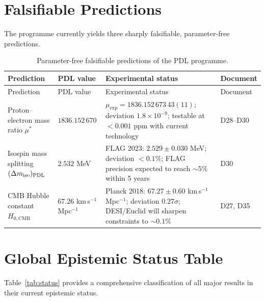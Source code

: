\documentclass[11pt,a4paper]{article}
\theoremstyle{plain}
\theoremstyle{definition}
\theoremstyle{remark}
\newcommand{\PDL}{\textnormal{PDL}}
\newcommand{\mustar}{\mu^*}
\begin{document}
\newpage

\section{Falsifiable Predictions}
\label{sec:predictions}

The programme currently yields three sharply falsifiable, parameter-free predictions.

\begin{longtable}{@{}L{4.5cm}L{3.5cm}L{3.5cm}L{2.0cm}@{}}
\caption{Parameter-free falsifiable predictions of the PDL programme.}
\label{tab:predictions}\\
\toprule
Prediction & PDL value & Experimental status & Document \\
\midrule
\endfirsthead
\toprule
Prediction & PDL value & Experimental status & Document \\
\midrule
\endhead
\bottomrule
\endfoot

Proton--electron mass ratio $\mustar$ &
$1836.152\,670$ &
$\mu_{\exp}=1836.152\,673\,43(11)$; deviation $1.8\times10^{-9}$; testable at $<0.001$ ppm with current technology &
D28--D30 \\[0.4em]

Isospin mass splitting $(\Delta m_{\mathrm{iso}})_{\PDL}$ &
$2.532$ MeV &
FLAG 2023: $2.529\pm0.030$ MeV; deviation $<0.1\%$; FLAG precision expected to reach $\sim 5\%$ within 5 years &
D30 \\[0.4em]

CMB Hubble constant $H_{0,\mathrm{CMB}}$ &
$67.26$ km\,s$^{-1}$\,Mpc$^{-1}$ &
Planck 2018: $67.27\pm0.60$ km\,s$^{-1}$\,Mpc$^{-1}$; deviation $0.27\sigma$; DESI/Euclid will sharpen constraints to $\sim 0.1\%$ &
D27, D35 \\[0.4em]

\end{longtable}

\section{Global Epistemic Status Table}
\label{sec:status}

Table~\ref{tab:status} provides a comprehensive classification of all major results in their current epistemic status.

\setlength{\LTpre}{12pt}
\setlength{\LTpost}{6pt}
\end{document}

